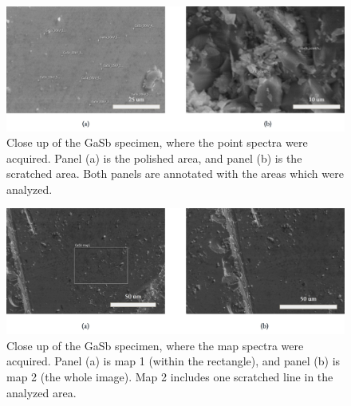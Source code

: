 \begin{figure}[htbp]
    \centering
    \includegraphics[width=.95\textwidth]{figures/SE_images/GaSb_close.jpg}
    \caption{
        Close up of the GaSb specimen, where the point spectra were acquired.
        Panel (a) is the polished area, and panel (b) is the scratched area.
        Both panels are annotated with the areas which were analyzed.
        }
    \label{fig:SE_images:GaSb}
\end{figure}


\begin{figure}[htbp]
    \centering
    \includegraphics[width=.95\textwidth]{figures/SE_images/GaSb_map.jpg}
    \caption{
        Close up of the GaSb specimen, where the map spectra were acquired.
        Panel (a) is map 1 (within the rectangle), and panel (b) is map 2 (the whole image).
        Map 2 includes one scratched line in the analyzed area.
        }
    \label{fig:SE_images:GaSb_map}
\end{figure}





